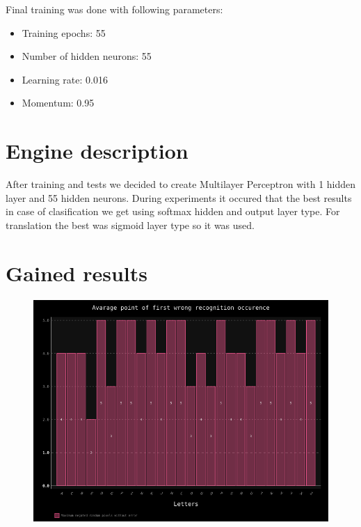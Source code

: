 \documentclass[a4paper]{article}
\begin{document}
Final training was done with following parameters:
\begin{itemize}
	\item Training epochs: 55
	\item Number of hidden neurons: 55
	\item Learning rate: 0.016
	\item Momentum: 0.95
\end{itemize}

\section{Engine description}

After training and tests we decided to create Multilayer Perceptron with 1 hidden layer and 55 hidden neurons. During experiments it occured that the best results in case of clasification we get using softmax hidden and output layer type. For translation the best was sigmoid layer type so it was used.

\clearpage
\pagebreak
\section{Gained results}

\begin{figure}[h!]
	\centering
	\includegraphics[scale=0.7,keepaspectratio=true]{Charts/RandNoiseTestPlanResultsChart_NormalTester.png}	
	\caption{}
	\label{noise_trans}
\end{figure}
\end{document}
